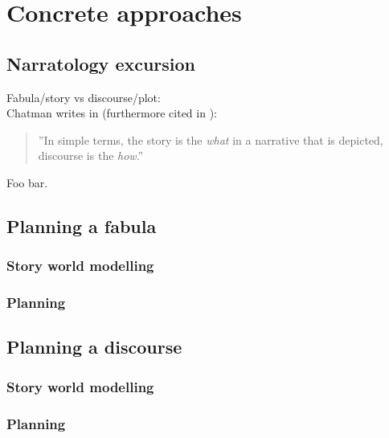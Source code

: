 \section{Concrete approaches}\label{approaches}
\subsection{Narratology excursion}
Fabula/story vs discourse/plot:\\
Chatman writes in \cite{Chatman1980} (furthermore cited in \cite{Herman10}):
\begin{quote}
''In simple terms, the story is the \emph{what} in a narrative that is depicted, discourse is the \emph{how}.''
\end{quote}
Foo bar.
\subsection{Planning a fabula}
\cite{Haslum14}
\subsubsection{Story world modelling}
\subsubsection{Planning}
\subsection{Planning a discourse}
\cite{Porteous10}
\subsubsection{Story world modelling}
\subsubsection{Planning}
